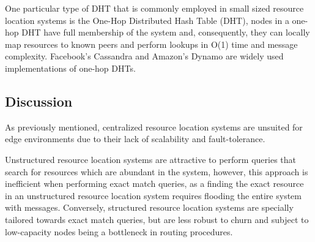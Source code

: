 One particular type of DHT that is commonly employed in small sized resource location systems is the One-Hop Distributed Hash Table (DHT), nodes in a one-hop DHT have full membership of the system and, consequently, they can locally map resources to known peers and perform lookups in O(1) time and message complexity. Facebook's Cassandra \cite{lakshman2010cassandra} and Amazon's Dynamo \cite{decandia2007dynamo} are widely used implementations of one-hop DHTs. 

\subsection{Discussion}

As previously mentioned, centralized resource location systems are unsuited for edge environments due to their lack of scalability and fault-tolerance.

Unstructured resource location systems are attractive to perform queries that search for resources which are abundant in the system, however, this approach is inefficient when performing exact match queries, as a finding the exact resource in an unstructured resource location system requires flooding the entire system with messages. Conversely, structured resource location systems are specially tailored towards exact match queries, but are less robust to churn and subject to low-capacity nodes being a bottleneck in routing procedures. 








